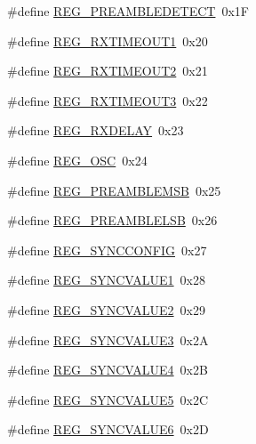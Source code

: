 \begin{DoxyCompactItemize}
\item 
\#define \mbox{\hyperlink{sx1276_regs-_fsk_8h_a8acf717d67c4e7f4b92a25653ddb495c}{R\+E\+G\+\_\+\+P\+R\+E\+A\+M\+B\+L\+E\+D\+E\+T\+E\+CT}}~0x1F
\item 
\#define \mbox{\hyperlink{sx1276_regs-_fsk_8h_afa819749e90d0ecb13a5d75f28af5ccb}{R\+E\+G\+\_\+\+R\+X\+T\+I\+M\+E\+O\+U\+T1}}~0x20
\item 
\#define \mbox{\hyperlink{sx1276_regs-_fsk_8h_aa5870403dc3e6ba5cb5212423051e18a}{R\+E\+G\+\_\+\+R\+X\+T\+I\+M\+E\+O\+U\+T2}}~0x21
\item 
\#define \mbox{\hyperlink{sx1276_regs-_fsk_8h_a8167beac9018acd4f54b530176170145}{R\+E\+G\+\_\+\+R\+X\+T\+I\+M\+E\+O\+U\+T3}}~0x22
\item 
\#define \mbox{\hyperlink{sx1276_regs-_fsk_8h_a8ee126fae09fa47e0ef722dc43a4dc22}{R\+E\+G\+\_\+\+R\+X\+D\+E\+L\+AY}}~0x23
\item 
\#define \mbox{\hyperlink{sx1276_regs-_fsk_8h_a1edb093ed684495473ecd2e97e3a49c2}{R\+E\+G\+\_\+\+O\+SC}}~0x24
\item 
\#define \mbox{\hyperlink{sx1276_regs-_fsk_8h_ab8a433a9dd9c4cebe485d1a1b49cfd4b}{R\+E\+G\+\_\+\+P\+R\+E\+A\+M\+B\+L\+E\+M\+SB}}~0x25
\item 
\#define \mbox{\hyperlink{sx1276_regs-_fsk_8h_a342040215f26acdefd5c95ec7c8ce828}{R\+E\+G\+\_\+\+P\+R\+E\+A\+M\+B\+L\+E\+L\+SB}}~0x26
\item 
\#define \mbox{\hyperlink{sx1276_regs-_fsk_8h_ae80bd3142a5c405bf7063ac7b0e8e101}{R\+E\+G\+\_\+\+S\+Y\+N\+C\+C\+O\+N\+F\+IG}}~0x27
\item 
\#define \mbox{\hyperlink{sx1276_regs-_fsk_8h_a4d0160e654656b6cd6426c295c8e131b}{R\+E\+G\+\_\+\+S\+Y\+N\+C\+V\+A\+L\+U\+E1}}~0x28
\item 
\#define \mbox{\hyperlink{sx1276_regs-_fsk_8h_a840d780f6d455dc828e2ec8217e9043a}{R\+E\+G\+\_\+\+S\+Y\+N\+C\+V\+A\+L\+U\+E2}}~0x29
\item 
\#define \mbox{\hyperlink{sx1276_regs-_fsk_8h_af89062529e96d32eecd0f89963d52adf}{R\+E\+G\+\_\+\+S\+Y\+N\+C\+V\+A\+L\+U\+E3}}~0x2A
\item 
\#define \mbox{\hyperlink{sx1276_regs-_fsk_8h_a9768416ceaebbdeab3fee291f351a98f}{R\+E\+G\+\_\+\+S\+Y\+N\+C\+V\+A\+L\+U\+E4}}~0x2B
\item 
\#define \mbox{\hyperlink{sx1276_regs-_fsk_8h_a834570d54f8b7370a5d42fc180650c14}{R\+E\+G\+\_\+\+S\+Y\+N\+C\+V\+A\+L\+U\+E5}}~0x2C
\item 
\#define \mbox{\hyperlink{sx1276_regs-_fsk_8h_a4e2e2802416f6a445a355828764363e2}{R\+E\+G\+\_\+\+S\+Y\+N\+C\+V\+A\+L\+U\+E6}}~0x2D

\end{DoxyCompactItemize}
